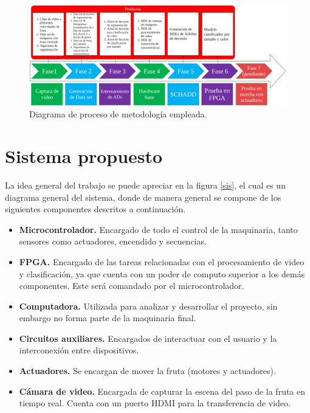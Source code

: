 \documentclass[twoside,spanish,ESP,MSc]{plantillaLabUPV}
\theoremstyle{definition}
\begin{document}
\begin{figure}[h]
	\centering
	\includegraphics[width=\linewidth]{edrawimas/metodo}
	\caption{Diagrama de proceso de metodología empleada.}
	\label{meth}
\end{figure}

\section{Sistema propuesto}
La idea general del trabajo se puede apreciar en la figura \ref{sis}, el cual es un diagrama general del sistema, donde de manera general se compone de los siguientes componentes descritos a continuación.

\begin{itemize}
	\item \textbf{Microcontrolador.} Encargado de todo el control de la maquinaria, tanto sensores como actuadores, encendido y secuencias. 
	\item \textbf{FPGA.} Encargado de las tareas relacionadas con el procesamiento de video y clasificación, ya que cuenta con un poder de computo superior a los demás componentes. Este será comandado por el microcontrolador.
	\item \textbf{Computadora.} Utilizada para analizar y desarrollar el proyecto, sin embargo no forma parte de la maquinaria final.
	\item \textbf{Circuitos auxiliares.} Encargados de interactuar con el usuario y la interconexión entre dispositivos.
	\item \textbf{Actuadores.} Se encargan de mover la fruta (motores y actuadores).
	\item \textbf{Cámara de video.} Encargada de capturar la escena del paso de la fruta en tiempo real. Cuenta con un puerto HDMI para la transferencia de video.
\end{itemize}
\end{document}
